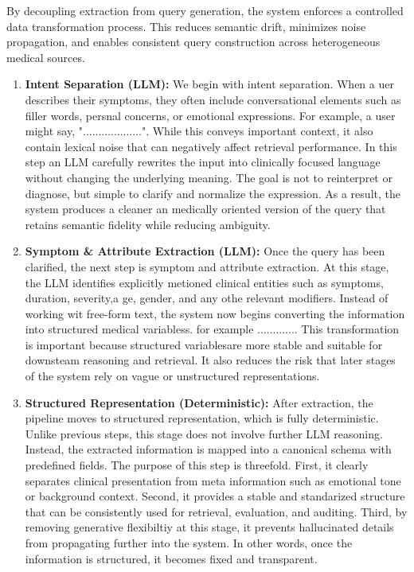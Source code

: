 \documentclass[conference, anonymous]{IEEEtran}
\begin{document}
By decoupling extraction from query generation, the system enforces a controlled data transformation process. This reduces semantic drift, minimizes noise propagation, and enables consistent query construction across heterogeneous medical sources.
\begin{enumerate}
    \item \textbf{Intent Separation (LLM):} We begin with intent separation. When a uer describes their symptoms, they often include conversational elements such as filler words, persnal concerns, or emotional expressions. For example, a user might say, "...................". While this conveys important context, it also contain lexical noise that can negatively affect retrieval performance. In this step an LLM carefully rewrites the input into clinically focused language  without changing the underlying meaning. The goal is not to reinterpret or diagnose, but simple to clarify and normalize the expression. As a result, the system produces a cleaner an medically oriented version of the query that retains semantic fidelity while reducing ambiguity.
    
    \item \textbf{Symptom \& Attribute Extraction (LLM):} Once the query has been clarified, the next step is symptom and attribute extraction. At this stage, the LLM identifies explicitly metioned clinical entities such as symptoms, duration, severity,a ge, gender, and any othe relevant modifiers. Instead of working wit free-form text, the system now begins converting the information into structured medical variabless. for example ............. This transformation is important because structured variablesare more stable and suitable for downsteam reasoning and retrieval. It also reduces the risk that later stages of the system rely on vague or unstructured representations.  
    
    \item \textbf{Structured Representation (Deterministic):} After extraction, the pipeline moves to structured representation, which is fully deterministic. Unlike previous steps, this stage does not involve further LLM reasoning. Instead, the extracted information is mapped into a canonical schema with predefined fields. The purpose of this step is threefold. First, it clearly separates clinical presentation from meta information such as emotional tone or background context. Second, it provides a stable and standarized structure that can be consistently used for retrieval, evaluation, and auditing. Third, by removing generative flexibiltiy at this stage, it prevents hallucinated details from propagating further into the system. In other words, once the information is structured, it becomes fixed and transparent. 
    

\end{enumerate}
\end{document}
